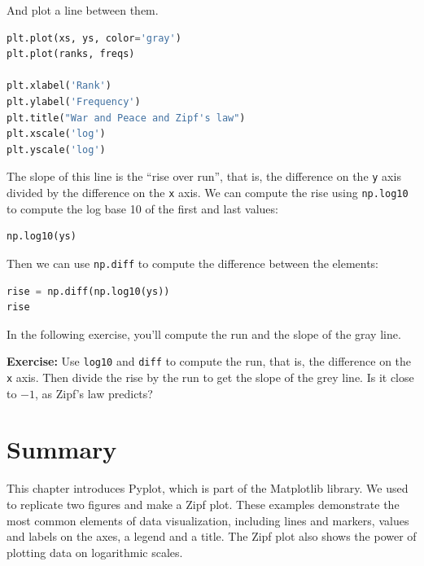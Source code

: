 And plot a line between them.

\begin{lstlisting}[language=Python,style=source]
plt.plot(xs, ys, color='gray')
plt.plot(ranks, freqs)

plt.xlabel('Rank')
plt.ylabel('Frequency')
plt.title("War and Peace and Zipf's law")
plt.xscale('log')
plt.yscale('log')
\end{lstlisting}

The slope of this line is the ``rise over run'', that is, the difference
on the \passthrough{\lstinline!y!} axis divided by the difference on the
\passthrough{\lstinline!x!} axis. We can compute the rise using
\passthrough{\lstinline!np.log10!} to compute the log base 10 of the
first and last values:

\begin{lstlisting}[language=Python,style=source]
np.log10(ys)
\end{lstlisting}

Then we can use \passthrough{\lstinline!np.diff!} to compute the
difference between the elements:

\begin{lstlisting}[language=Python,style=source]
rise = np.diff(np.log10(ys))
rise
\end{lstlisting}

In the following exercise, you'll compute the run and the slope of the
gray line.

\textbf{Exercise:} Use \passthrough{\lstinline!log10!} and
\passthrough{\lstinline!diff!} to compute the run, that is, the
difference on the \passthrough{\lstinline!x!} axis. Then divide the rise
by the run to get the slope of the grey line. Is it close to \(-1\), as
Zipf's law predicts?

\hypertarget{summary}{%
\section{Summary}\label{summary}}

This chapter introduces Pyplot, which is part of the Matplotlib library.
We used to replicate two figures and make a Zipf plot. These examples
demonstrate the most common elements of data visualization, including
lines and markers, values and labels on the axes, a legend and a title.
The Zipf plot also shows the power of plotting data on logarithmic
scales.

